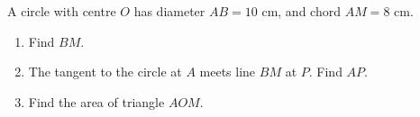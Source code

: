 A circle with centre $O$ has diameter $AB=10$ cm, and chord $AM=8$ cm.
\begin{enumerate}
\item Find $BM$.
\item The tangent to the circle at $A$ meets line $BM$ at $P$. Find $AP$.
\item Find the area of triangle $AOM$.
\end{enumerate}
